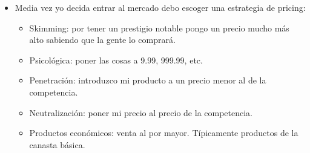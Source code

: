 \begin{itemize}
    \item Media vez yo decida entrar al mercado debo escoger una estrategia de pricing:
        \begin{itemize}
            \item Skimming: por tener un prestigio notable pongo un precio mucho más alto sabiendo que la gente lo comprará.
            \item Psicológica: poner las cosas a 9.99, 999.99, etc. 
            \item Penetración: introduzco mi producto a un precio menor al de la competencia.
            \item Neutralización: poner mi precio al precio de la competencia.
            \item Productos económicos: venta al por mayor. Típicamente productos de la canasta básica.
        \end{itemize}
\end{itemize}
